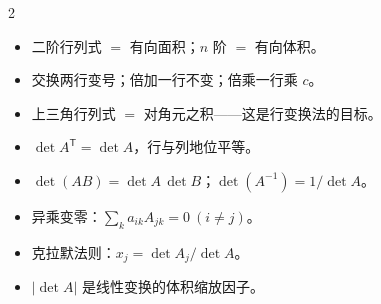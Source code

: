 \documentclass[11pt,a4paper,openany]{ctexbook}
\begin{document}
\begin{chapkeys}
\small
\begin{multicols}{2}
\begin{itemize}[leftmargin=1.5em, itemsep=2pt]
\item 二阶行列式 $=$ 有向面积；$n$ 阶 $=$ 有向体积。
\item 交换两行变号；倍加一行不变；倍乘一行乘 $c$。
\item 上三角行列式 $=$ 对角元之积——这是行变换法的目标。
\item $\det A^{\mathsf T}=\det A$，行与列地位平等。
\item $\det(AB)=\det A\,\det B$；$\det(A^{-1})=1/\det A$。
\item 异乘变零：$\sum_k a_{ik}A_{jk}=0\ (i\neq j)$。
\item 克拉默法则：$x_j=\det A_j/\det A$。
\item $|\det A|$ 是线性变换的体积缩放因子。
\end{itemize}
\end{multicols}
\end{chapkeys}
\end{document}
